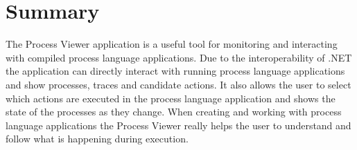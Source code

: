 	

\section{Summary}

	The Process Viewer application is a useful tool for monitoring and 
	interacting with compiled process language applications. Due to the 
	interoperability of .NET the application can directly interact with running 
	process language applications and show processes, traces and candidate 
	actions. It also allows the user to select which actions are executed in the 
	process language application and shows the state of the processes as they 
	change. When creating and working with process language applications the 
	Process Viewer really helps the user to understand and follow what is 
	happening during execution.